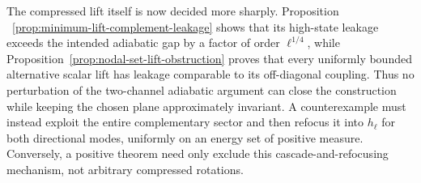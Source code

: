 \documentclass[11pt]{article}
\theoremstyle{definition}
\theoremstyle{remark}
\begin{document}
The compressed lift itself is now decided more sharply.  Proposition
~\ref{prop:minimum-lift-complement-leakage} shows that its high-state leakage
exceeds the intended adiabatic gap by a factor of order $\ell^{1/4}$, while
Proposition~\ref{prop:nodal-set-lift-obstruction} proves that every uniformly
bounded alternative scalar lift has leakage comparable to its off-diagonal
coupling.  Thus no perturbation of the two-channel adiabatic argument can close
the construction while keeping the chosen plane approximately invariant.  A
counterexample must instead exploit the entire complementary sector and then
refocus it into $h_\ell$ for both directional modes, uniformly on an energy
set of positive measure.  Conversely, a positive theorem need only exclude
this cascade-and-refocusing mechanism, not arbitrary compressed rotations.
\end{document}
